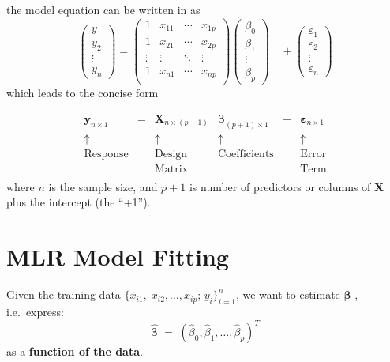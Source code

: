 \documentclass[
]{book}
\begin{document}
the model equation can be written in as
\[\left(\begin{array}{c} 
      y_{1} \\ y_{2} \\ \vdots \\ y_{n}
    \end{array}\right) = \left(\begin{array}{ccccc}
   1&x_{11}& \cdots &x_{1p} \\
   1& x_{21}& \cdots&x_{2p}   \\
   \vdots & \vdots & \ddots & \vdots\\
  1 & x_{n1} & \cdots & x_{np}  \\
    \end{array} \right) \left(\begin{array}{c} 
      \beta_{0} \\ \beta_{1} \\ \vdots \\ \beta_p
    \end{array}\right)\quad + 
\left(\begin{array}{c} 
      \varepsilon_{1} \\ \varepsilon_{2} \\ \vdots \\ \varepsilon_{n}
    \end{array}\right)
  \]
which leads to the concise form

\[
  \begin{array}{cccccc}
\mathbf{y}_{n\times 1} &=&\mathbf{X}_{n\times (p+1)}  &\mathbf{\beta}_{(p+1)\times 1}&+&\mathbf{\varepsilon}_{n\times 1}\\
\uparrow & & \uparrow & \uparrow & & \uparrow\\
\text{Response} &&\text{Design} & \text{Coefficients} & & \text{Error}\\
&&\text{Matrix} & && \text{Term}\\
\end{array}
\]
where \(n\) is the sample size, and \(p+1\) is number of predictors or columns of \(\mathbf{X}\) plus the intercept (the ``+1'').

\section{MLR Model Fitting}\label{mlr-model-fitting}

Given the training data \(\bigl\{ x_{i1},\; x_{i2}, \ldots, x_{ip};\, y_i\bigr\}_{i=1}^{n}\), we want to estimate \(\mathbf{\beta}\) , i.e.~express:
\[
    \hat{\mathbf{\beta}} \;=\; 
      \left(\hat{\beta}_0,\hat{\beta}_1,\ldots,\hat{\beta}_p\right)^{T}
  \]
as a \textbf{function of the data}.
\end{document}
